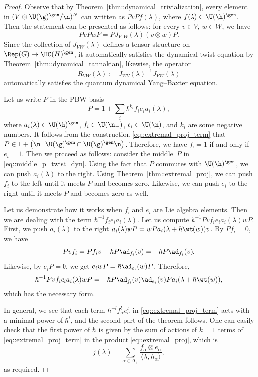 \begin{Theorem}
\begin{proof}
			Observe that by Theorem~\ref{thm::dynamical_trivialization}, every element in $(V \otimes \U(\g)^{\gen} / \n)^{N}$ can written as $PvP f(\lambda)$, where $f(\lambda) \in \U(\h)^{\gen}$. Then the statement can be presented as follows: for every $v\in V$, $w\in W$, we have
			\begin{equation}
				\label{eq::middle_p_twist_dyn}
				Pv Pw P= PJ_{V,W}(\lambda) (v\otimes w) P.
			\end{equation}
			Since the collection of $J_{VW}(\lambda)$ defines a tensor structure on $\Rep(G) \rightarrow \HC(H)^{\gen}$, it automatically satisfies the dynamical twist equation by Theorem~\ref{thm::dynamical_tannakian}, likewise, the operator
			\[
				R_{VW}(\lambda) := J_{WV}(\lambda)^{-1} J_{VW}(\lambda)
			\]
			automatically satisfies the quantum dynamical Yang--Baxter equation.
			
			Let us write $P$ in the PBW basis
			\[
			P = 1 + \sum_i \hbar^{k_i} f_i e_i a_i(\lambda),
			\]
			where $a_i(\lambda) \in \U(\h)^{\gen}$, $f_i \in \U(\n_-)$, $e_i \in \U(\n)$, and $k_i$ are some negative numbers. It follows from the construction \eqref{eq::extremal_proj_term} that
$
			P\in 1 + \bigl(\n_- \U(\g)^{\gen} \cap \U(\g)^{\gen} \n\bigr)$.
			Therefore, we have $f_i =1$ if and only if $e_i=1$. Then we proceed as follows: consider the middle~$P$ in \eqref{eq::middle_p_twist_dyn}. Using the fact that $P$ commutes with $\U(\h)^{\gen}$, we can push $a_i(\lambda)$ to the right. Using Theorem~\ref{thm::extremal_proj}, we can push $f_i$ to the left until it meets $P$ and becomes zero. Likewise, we can push $e_i$ to the right until it meets $P$ and becomes zero as well.
			
			Let us demonstrate how it works when $f_i$ and $e_i$ are Lie algebra elements. Then we are dealing with the term $\hbar^{-1} f_i e_i a_i(\lambda)$. Let us compute $\hbar^{-1} Pv f_i e_i a_i(\lambda) wP$. First, we push $a_i(\lambda)$ to the right
$
			a_i(\lambda) w P = wPa_i(\lambda + \hbar \wt(w))v$.
			By $Pf_i = 0$, we have
			\[
			Pvf_i = Pf_i v - \hbar P\ad_{f_i}(v) = - \hbar P\ad_{f_i}(v).
			\]
			Likewise, by $e_i P = 0$, we get
			$
			e_i w P= \hbar \ad_{e_i}(w) P$.
			Therefore,
			\[
			\hbar^{-1} Pv f_i e_i a_i(\lambda) wP = -\hbar P \ad_{f_i}(v) \ad_{e_i}(v) P a_i(\lambda + \hbar \wt(w)),
			\]
			which has the necessary form.
			
			In general, we see that each term $\hbar^{-l}f_{\alpha}^l e_{\alpha}^l$ in \eqref{eq::extremal_proj_term} acts with a minimal power of $\hbar^l$, and the second part of the theorem follows. One can easily check that the first power of $\hbar$ is given by the sum of actions of $k=1$ terms of \eqref{eq::extremal_proj_term} in the product \eqref{eq::extremal_proj}, which is
			\[
			j(\lambda) = \sum\limits_{\alpha\in \Delta_+} \frac{f_{\alpha} \otimes e_{\alpha}}{\langle \lambda, h_{\alpha} \rangle },
			\]
			as required.
		\end{proof}
	\end{Theorem}

